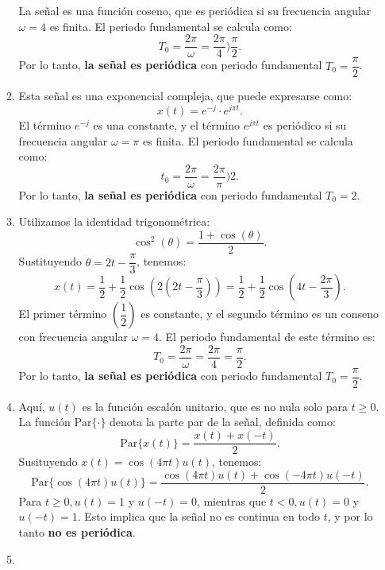 \begin{enumerate}[label=\color{red}\textbf{\arabic*)}]
\begin{enumerate}[label=\color{red}\textbf{\alph*)}]
          La señal es una función coseno, que es periódica si su frecuencia angular $\omega=4$ es finita. El periodo fundamental se calcula como: \[
          T_0=\dfrac{2\pi}{\omega}=\dfrac{2\pi}{4})\dfrac{\pi}{2}.
          \] 
          Por lo tanto, \textbf{la señal es periódica} con periodo fundamental $T_0=\dfrac{\pi}{2}$.
      \item {} 
          
          Esta señal es una exponencial compleja, que puede expresarse como: \[
          x(t)=e^{-j}\cdot e^{j\pi t}.  
          \] 
          El término $e^{-j} $ es una constante, y el término $e^{j\pi t} $ es periódico si su frecuencia angular $\omega=\pi$ es finita. El periodo fundamental se calcula como: \[
          t_0=\dfrac{2\pi}{\omega}=\dfrac{2\pi}{\pi})2.
          \] 
          Por lo tanto, \textbf{la señal es periódica} con periodo fundamental $T_0=2$.
      \item {} 

          Utilizamos la identidad trigonométrica: \[
          \cos^2(\theta)=\dfrac{1+\cos(\theta)}{2}.
          \] 
          Sustituyendo $\theta=2t-\dfrac{\pi}{3}$, tenemos: \[
          x(t)=\dfrac{1}{2}+\dfrac{1}{2}\cos\left( 2\left( 2t-\dfrac{\pi}{3} \right)  \right) =\dfrac{1}{2}+\dfrac{1}{2}\cos\left( 4t-\dfrac{2\pi}{3} \right) .
          \] 
          El primer término $\left( \dfrac{1}{2} \right) $ es constante, y el segundo término es un conseno con frecuencia angular $\omega=4$. El periodo fundamental de este término es: \[
          T_0=\dfrac{2\pi}{\omega}=\dfrac{2\pi}{4}=\dfrac{\pi}{2}.
          \] 
          Por lo tanto, \textbf{la señal es periódica} con periodo fundamental $T_0=\dfrac{\pi}{2}$.
      \item {} 

          Aquí, $u(t)$ es la función escalón unitario, que es no nula solo para $t\ge 0$. La función $\mathrm{Par}\{\cdot \} $ denota la parte par de la señal, definida como: \[
          \mathrm{Par}\{x(t)\} =\dfrac{x(t)+x(-t)}{2}.
          \] 
          Susituyendo $x(t)=\cos(4\pi t)u(t)$, tenemos: \[
          \mathrm{Par}\{\cos(4\pi t)u(t)\} =\dfrac{\cos(4\pi t)u(t)+\cos(-4\pi t)u(-t)}{2}.
          \] 
          Para $t\ge 0,u(t)=1$ y $u(-t)=0$, mientras que  $t<0,u(t)=0$ y $u(-t)=1$. Esto implica que la señal no es continua en todo  $t$, y por lo tanto  \textbf{no es periódica}. 
      \item {} 


\end{enumerate}
\end{enumerate}
